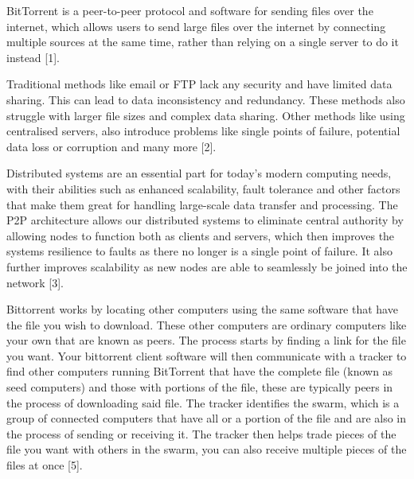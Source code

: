 \documentclass[landscape]{a0poster}
\begin{document}

\begin{multicols*}{3}

BitTorrent is a peer-to-peer protocol and software for sending files over the internet, which allows users to send large files over the internet by connecting multiple sources at the same time, rather than relying on a single server to do it instead [1].

Traditional methods like email or FTP lack any security and have limited data sharing. This can lead to data inconsistency and redundancy. These methods also struggle with larger file sizes and complex data sharing. Other methods like using centralised servers, also introduce problems like single points of failure, potential data loss or corruption and many more [2].

Distributed systems are an essential part for today’s modern computing needs, with their abilities such as enhanced scalability, fault tolerance and other factors that make them great for handling large-scale data transfer and processing. The P2P architecture allows our distributed systems to eliminate central authority by allowing nodes to function both as clients and servers, which then improves the systems resilience to faults as there no longer is a single point of failure. It also further improves scalability as new nodes are able to seamlessly be joined into the network [3].


Bittorrent works by locating other computers using the same software that have the file you wish to download. These other computers are ordinary computers like your own that are known as peers.
The process starts by finding a link for the file you want. Your bittorrent client software will then communicate with a tracker to find other computers running BitTorrent that have the complete file (known as seed computers) and those with portions of the file, these are typically peers in the process of downloading said file. The tracker identifies the swarm, which is a group of connected computers that have all or a portion of the file and are also in the process of sending or receiving it. The tracker then helps trade pieces of the file you want with others in the swarm, you can also receive multiple pieces of the files at once [5].


\end{multicols*}
\end{document}
